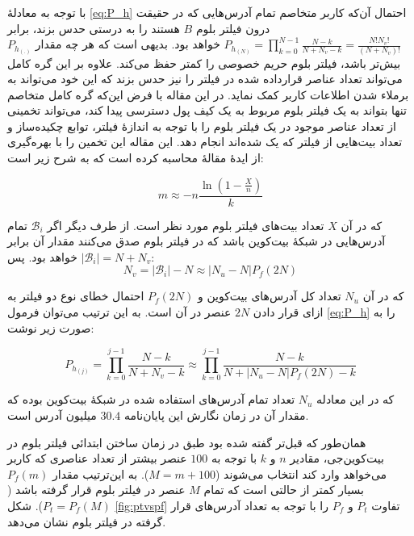    با توجه به معادلهٔ \eqref{eq:P_h} احتمال آن‌که کاربر متخاصم تمام آدرس‌هایی که در حقیقت درون فیلتر بلوم $B$ هستند را به درستی حدس بزند، برابر 
  $P_{h_{(N)}} = \prod_{k=0}^{N-1}\frac{N-k}{N+N_v-k} = \frac{N!N_v!}{(N+N_v)!}$
  خواهد بود\cite{Gervais2014}. بدیهی است که هر چه مقدار $P_{h_{(.)}}$ بیش‌تر باشد،‌ فیلتر بلوم حریم خصوصی را کمتر حفظ می‌کند. علاوه بر این گره کامل می‌تواند تعداد عناصر قرارداده شده در فیلتر را نیز حدس بزند که این خود می‌تواند به برملاء شدن اطلاعات کاربر کمک نماید. در این مقاله با فرض این‌که گره کامل متخاصم تنها بتواند به یک فیلتر بلوم مربوط به یک کیف پول دسترسی پیدا کند، می‌تواند تخمینی از تعداد عناصر موجود در یک فیلتر بلوم را با توجه به اندازهٔ فیلتر، توابع چکیده‌ساز و تعداد بیت‌هایی از فیلتر که یک شده‌اند انجام دهد. این مقاله این تخمین را با بهره‌گیری از ایدهٔ مقالهٔ \cite{Swamidass2007} محاسبه کرده است که به شرح زیر است:
  
   \begin{equation}
  \label{eq:m_estimation}
 m \approx -n\frac{\ln\left(1-\frac{X}{n}\right)}{k}
  \end{equation}
 
 که در آن $X$ تعداد بیت‌های فیلتر بلوم مورد نظر است. از طرف دیگر  اگر 
 $\mathcal{B}_i$
 تمام آدرس‌هایی در شبکهٔ بیت‌کوین باشد که در فیلتر بلوم صدق می‌کنند مقدار آن برابر 
 $|\mathcal{B}_i| = N + N_v$
 خواهد بود. پس:
  \begin{equation}
 \label{eq:N_v_estimation}
 N_v = |\mathcal{B}_i| - N  \approx  |N_u-N|P_f(2N) 
 \end{equation}
 
 که در آن $N_u$ تعداد کل آدرس‌های بیت‌کوین و $P_f(2N)$ احتمال خطای نوع دو فیلتر به ازای قرار دادن $2N$ عنصر در آن است. به این ترتیب می‌توان فرمول \eqref{eq:P_h} را به صورت زیر نوشت:
 
  \begin{equation}
 \label{eq:P_h_estimation}
 P_{h_{(j)}} = \prod_{k=0}^{j-1}\frac{N-k}{N+N_v-k} \approx \prod_{k=0}^{j-1}\frac{N-k}{N+|N_u-N|P_f(2N)-k}
 \end{equation}

که در این معادله $N_u$ تعداد تمام آدرس‌های استفاده شده در شبکهٔ بیت‌کوین بوده که مقدار آن در زمان نگارش این پایان‌نامه $30.4$ میلیون آدرس است.

همان‌طور که قبل‌تر گفته شده بود طبق \cite{Gervais2014} در زمان ساختن ابتدائی فیلتر بلوم در بیت‌کوین‌جی، مقادیر $n$ و $k$ با توجه به $100$ عنصر بیشتر از تعداد عناصری که کاربر می‌خواهد وارد کند انتخاب می‌شوند ($M=m+100$). به این‌ترتیب مقدار $P_f(m)$ بسیار کمتر از حالتی است که تمام $M$ عنصر در فیلتر بلوم قرار گرفته باشد ($P_t = P_f(M)$). شکل \ref{fig:ptvspf} تفاوت $P_t$ و $P_f$ را با توجه به تعداد آدرس‌های قرار گرفته در فیلتر بلوم نشان می‌دهد. 


